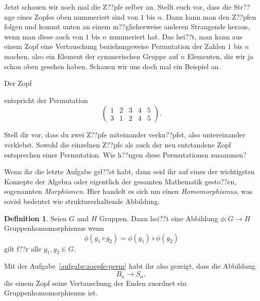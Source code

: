 \documentclass[a4paper,ngerman,12pt]{zirkelblatt1415}
\theoremstyle{definition}
\newtheorem{defn}{Definition}[section]
\theoremstyle{plain}
\theoremstyle{remark}
\newcommand{\lra}{\longrightarrow}
\begin{document}
Jetzt schauen wir noch mal die Z??pfe selber an. Stellt euch vor, dass die Str??nge eines Zopfes oben nummeriert sind von $1$ bis $n$. Dann kann man den Z??pfen folgen und kommt unten an einem m??glicherweise anderen Strangende heraus, wenn man diese auch von $1$ bis $n$ nummeriert hat. Das hei??t, man kann aus einem Zopf eine Vertauschung beziehungsweise Permutation der Zahlen $1$ bis $n$ machen, also ein Element der symmerischen Gruppe auf $n$ Elementen, die wir ja schon oben gesehen haben. Schauen wir uns doch mal ein Beispiel an.

Der Zopf
\begin{center}
\end{center}
entspricht der Permutation
\begin{equation*}
  \begin{pmatrix}
    1 & 2 & 3 & 4 & 5 \\
    3 & 1 & 2 & 4 & 5
  \end{pmatrix}.
\end{equation*}

\begin{aufgabe}{}
  Stell dir vor, dass du zwei Z??pfe miteinander verkn??pfst, also untereinander verklebst. Sowohl die einzelnen Z??pfe als auch der neu entstandene Zopf entsprechen einer Permutation. Wie h??ngen diese Permutationen zusammen?
\label{aufgabe:zoepfe-perm}
\end{aufgabe}

Wenn ihr die letzte Aufgabe gel??st habt, dann seid ihr auf eines der wichtigsten Konzepte der Algebra oder eigentlich der gesamten Mathematik gesto??en, sogenannten \emph{Morphismen}. Hier handelt es sich um einen \emph{Homomorphismus}, was soviel bedeutet wie strukturerhaltende Abbildung.

\begin{defn}
  Seien $G$ und $H$ Gruppen. Dann hei??t eine Abbildung $\phi:G\lra H$ Gruppenhomomorphismus wenn
  \begin{equation*}
    \phi(g_1\circ g_2)=\phi(g_1)\circ\phi(g_2)
  \end{equation*}
  gilt f??r alle $g_1,g_2\in G$.
\end{defn}

Mit der Aufgabe~\ref{aufgabe:zoepfe-perm} habt ihr also gezeigt, dass die Abbildung
\begin{equation*}
  B_n\lra S_n,
\end{equation*}
die einem Zopf seine Vertauschung der Enden zuordnet ein Gruppenhomomorphismus ist.
\end{document}
